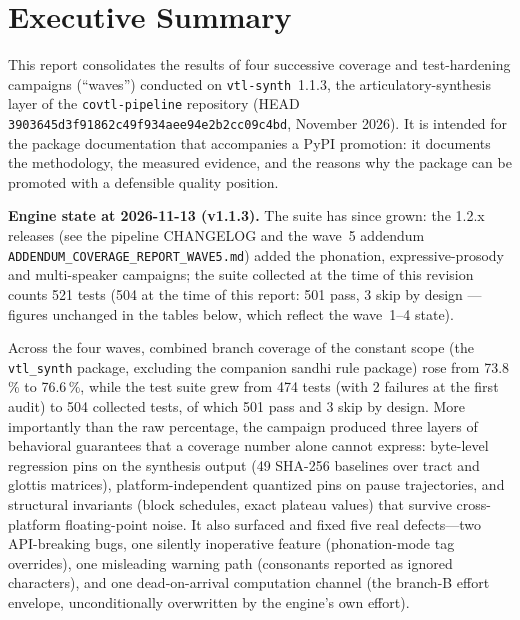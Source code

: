 \documentclass[11pt,a4paper]{article}
\newcommand{\code}[1]{\texttt{#1}}
\newcommand{\pkg}[1]{\texttt{#1}}
\newcommand{\pct}[1]{{#1}\,\%}
\begin{document}

\tableofcontents
\newpage

\section{Executive Summary}
\label{sec:summary}

This report consolidates the results of four successive coverage and
test-hardening campaigns (``waves'') conducted on
\pkg{vtl-synth}~1.1.3, the articulatory-synthesis layer of the
\pkg{covtl-pipeline} repository (HEAD
\code{3903645d3f91862c49f934aee94e2b2cc09c4bd}, November 2026). It is
intended for the package documentation that accompanies a PyPI
promotion: it documents the methodology, the measured evidence, and the
reasons why the package can be promoted with a defensible quality
position.

\textbf{Engine state at 2026-11-13 (v1.1.3).} The suite has since
grown: the 1.2.x releases (see the pipeline CHANGELOG and the wave~5
addendum \code{ADDENDUM\_COVERAGE\_REPORT\_WAVE5.md}) added the
phonation, expressive-prosody and multi-speaker campaigns; the suite
collected at the time of this revision counts 521 tests (504 at the
time of this report: 501 pass, 3 skip by design --- figures unchanged
in the tables below, which reflect the wave~1--4 state).

Across the four waves, combined branch coverage of the constant scope
(the \pkg{vtl\_synth} package, excluding the companion sandhi rule
package) rose from \pct{73.8} to \pct{76.6}, while the test suite grew
from 474 tests (with 2 failures at the first audit) to 504 collected
tests, of which 501 pass and 3 skip by design. More importantly than
the raw percentage, the campaign produced three layers of behavioral
guarantees that a coverage number alone cannot express: byte-level
regression pins on the synthesis output (49 SHA-256 baselines over
tract and glottis matrices), platform-independent quantized pins on
pause trajectories, and structural invariants (block schedules, exact
plateau values) that survive cross-platform floating-point noise. It
also surfaced and fixed five real defects---two API-breaking bugs, one
silently inoperative feature (phonation-mode tag overrides), one
misleading warning path (consonants reported as ignored characters),
and one dead-on-arrival computation channel (the branch-B effort
envelope, unconditionally overwritten by the engine's own effort).
\end{document}
